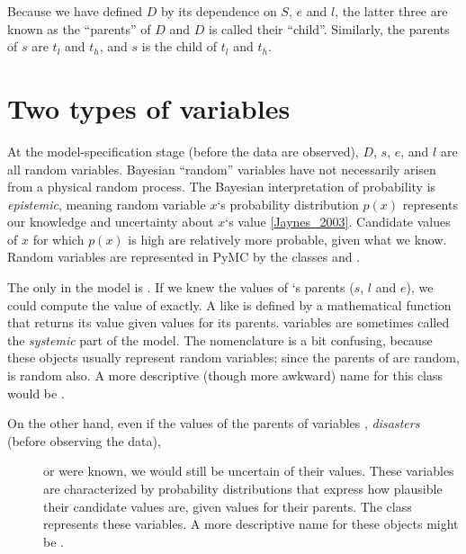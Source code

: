 \documentclass[letterpaper,10pt,english]{sphinxmanual}
\begin{document}
Because we have defined $D$ by its dependence on $S$, $e$ and $l$, the latter three are known as the ``parents'' of $D$ and $D$ is called their ``child''. Similarly, the parents of $s$ are $t_l$ and $t_h$, and $s$ is the child of $t_l$ and $t_h$.


\section{Two types of variables}
\label{tutorial:two-types-of-variables}
At the model-specification stage (before the data are observed), $D$, $s$, $e$,  and $l$ are all random variables. Bayesian ``random'' variables have not necessarily arisen from a physical random process. The Bayesian interpretation of probability is \emph{epistemic}, meaning random variable $x$`s probability distribution $p(x)$ represents our knowledge and uncertainty about $x$`s value {\hyperref[references:jaynes-2003]{{[}Jaynes\_2003{]}}}. Candidate values of $x$ for which $p(x)$ is high are relatively more probable, given what we know. Random variables are represented in PyMC by the classes  and .

The only  in the model is . If we knew the values of `s parents ($s$, $l$ and $e$), we could compute the value of  exactly. A  like  is defined by a mathematical function that returns its value given values for its parents.  variables are sometimes called the \emph{systemic} part of the model. The nomenclature is a bit confusing, because these objects usually represent random variables; since the parents of  are random,  is random also. A more descriptive (though more awkward) name for this class would be .
\begin{description}
\item[{On the other hand, even if the values of the parents of variables , \emph{disasters} (before observing the data), }] \leavevmode
or  were known, we would still be uncertain of their values. These variables are characterized by probability distributions that express how plausible their candidate values are, given values for their parents. The  class represents these variables. A more descriptive name for these objects might be .

\end{description}
\end{document}
